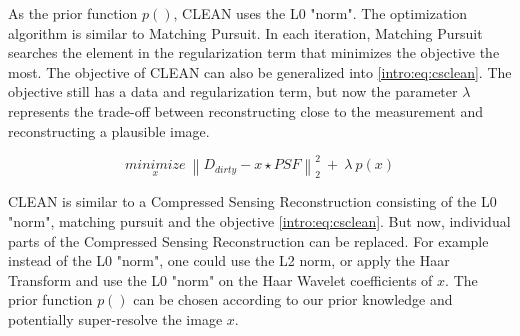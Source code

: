 As the prior function $p()$, CLEAN uses the L0 "norm". The optimization algorithm is similar to Matching Pursuit. In each iteration, Matching Pursuit searches the element in the regularization term that minimizes the objective the most. The objective of CLEAN can also be generalized into \eqref{intro:eq:csclean}. The objective still has a data and regularization term, but now the parameter $\lambda$ represents the trade-off between reconstructing close to the measurement and reconstructing a plausible image.

\begin{equation}\label{intro:eq:csclean}
\underset{x}{minimize} \: \left \| D_{dirty} - x \star PSF \right \|_2^2 \: + \: \lambda \: p(x) 
\end{equation}

CLEAN is similar to a Compressed Sensing Reconstruction consisting of the L0 "norm", matching pursuit and the objective \eqref{intro:eq:csclean}. But now, individual parts of the Compressed Sensing Reconstruction can be replaced. For example instead of the L0 "norm", one could use the L2 norm, or apply the Haar Transform and use the L0 "norm" on the Haar Wavelet coefficients of $x$. The prior function $p()$ can be chosen according to our prior knowledge and potentially super-resolve the image $x$.



